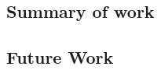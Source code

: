 \subsection{Summary of work}%
\label{sec:Res1_Summary}


\subsection{Future Work}%
\label{sec:Res1_future}